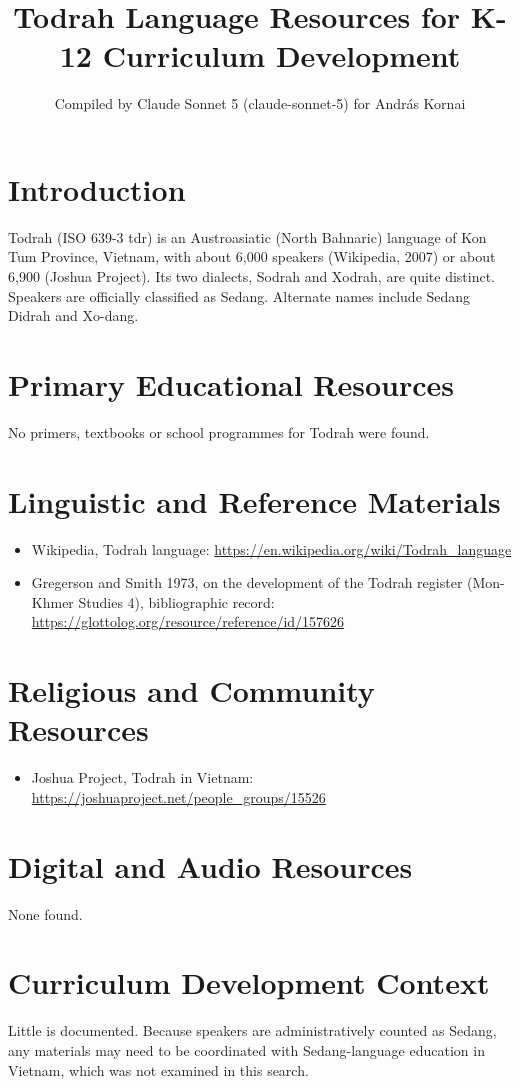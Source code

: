 \documentclass[12pt]{article}
\title{Todrah Language Resources for K-12 Curriculum Development}
\author{Compiled by Claude Sonnet 5 (claude-sonnet-5) for Andr\'as Kornai}
\date{}
\begin{document}
\maketitle
\section{Introduction}
Todrah (ISO 639-3 tdr) is an Austroasiatic (North Bahnaric) language of Kon Tum Province, Vietnam, with about 6,000 speakers (Wikipedia, 2007) or about 6,900 (Joshua Project). Its two dialects, Sodrah and Xodrah, are quite distinct. Speakers are officially classified as Sedang. Alternate names include Sedang Didrah and Xo-dang.
\section{Primary Educational Resources}
No primers, textbooks or school programmes for Todrah were found.
\section{Linguistic and Reference Materials}
\begin{itemize}
\item Wikipedia, Todrah language: \url{https://en.wikipedia.org/wiki/Todrah_language}
\item Gregerson and Smith 1973, on the development of the Todrah register (Mon-Khmer Studies 4), bibliographic record: \url{https://glottolog.org/resource/reference/id/157626}
\end{itemize}
\section{Religious and Community Resources}
\begin{itemize}
\item Joshua Project, Todrah in Vietnam: \url{https://joshuaproject.net/people_groups/15526}
\end{itemize}
\section{Digital and Audio Resources}
None found.
\section{Curriculum Development Context}
Little is documented. Because speakers are administratively counted as Sedang, any materials may need to be coordinated with Sedang-language education in Vietnam, which was not examined in this search.
\end{document}
